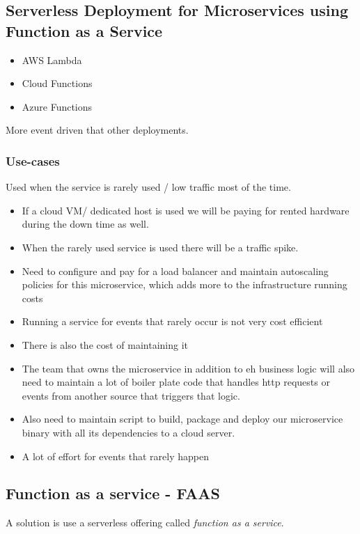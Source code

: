 \documentclass[a4paper, 11pt]{book}
\begin{document}
    \subsection{Serverless Deployment for Microservices using Function as a Service}

    \begin{itemize}
        \item AWS Lambda
        \item Cloud Functions
        \item Azure Functions
    \end{itemize}

    More event driven that other deployments.

    \subsubsection{Use-cases}
    Used when the service is rarely used / low traffic most of the time.
    \begin{itemize}
        \item If a cloud VM/ dedicated host is used we will be paying for rented hardware during the down time as well.
        \item When the rarely used service is used there will be a traffic spike.
        \item Need to configure and pay for a load balancer and maintain autoscaling policies for this microservice, which adds more to the infrastructure running costs
        \item Running a service for events that rarely occur is not very cost efficient
        \item There is also the cost of maintaining it
        \item The team that owns the microservice in addition to eh business logic will also need to maintain a lot of boiler plate code that handles http requests or events from another source that triggers that logic.
        \item Also need to maintain script to build, package and deploy our microservice binary with all its dependencies to a cloud server.
        \item A lot of effort for events that rarely happen
    \end{itemize}

    \subsection{Function as a service - FAAS}
    A solution is use a serverless offering called \textit{function as a service}.
\end{document}
